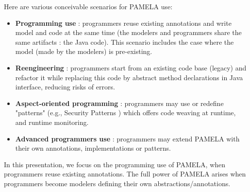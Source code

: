 Here are various conceivable scenarios for PAMELA use:
\begin{itemize}
    \vspace{-0.2cm}\item \textbf{Programming use} : programmers reuse existing annotations and write model and code at the same time (the modelers and programmers share the same artifacts : the Java code). This scenario includes the case where the model (made by the modelers) is pre-existing.
    \vspace{-0.2cm}\item \textbf{Reengineering} : programmers start from an existing code base (legacy) and refactor it while replacing this code by abstract method declarations in Java interface, reducing risks of errors.
    \vspace{-0.2cm}\item \textbf{Aspect-oriented programming} : programmers may use or redefine "patterns" (e.g., Security Patterns \cite{silva20}) which offers code weaving at runtime, and runtime monitoring.
    \vspace{-0.2cm}\item \textbf{Advanced programmers use} : programmers may extend PAMELA with their own annotations, implementations or patterns.
\end{itemize}

In this presentation, we focus on the programming use of PAMELA, when programmers reuse existing annotations. The full power of PAMELA arises when programmers become modelers defining their own abstractions/annotations.

